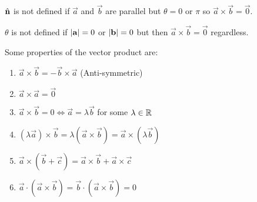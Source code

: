 \documentclass[../main.tex]{subfiles}
\begin{document}
\begin{center}
\end{center}
\begin{remark}
  $\hat{\mathbf{n}}$ is not defined if $\vec{a}$ and $\vec{b}$ are parallel but $\theta = 0 \text{ or } \pi$ so $\vec{a} \times \vec{b} = \vec{0}$.

  $\theta$ is not defined if $\left\lvert \boldsymbol{\mathbf{a}} \right\rvert = 0$ or $\left\lvert \boldsymbol{\mathbf{b}} \right\rvert = 0$ but then $\vec{a} \times \vec{b} = \vec{0}$ regardless.
\end{remark}
Some properties of the vector product are:
\begin{enumerate}
  \item $\vec{a} \times \vec{b} = - \vec{b} \times \vec{a}$ (Anti-symmetric)
  \item $\vec{a} \times \vec{a} = \vec{0}$
  \item $\vec{a} \times \vec{b} = 0 \iff \vec{a} = \lambda \vec{b}$ for some $\lambda \in \mathbb{R}$
  \item $(\lambda \vec{a}) \times \vec{b} = \lambda (\vec{a} \times \vec{b}) = \vec{a} \times (\lambda \vec{b})$
  \item $\vec{a} \times (\vec{b} + \vec{c}) = \vec{a} \times \vec{b} + \vec{a} \times \vec{c}$
  \item $\vec{a} \cdot (\vec{a} \times \vec{b}) = \vec{b} \cdot (\vec{a} \times \vec{b}) = 0$
\end{enumerate}
\end{document}
